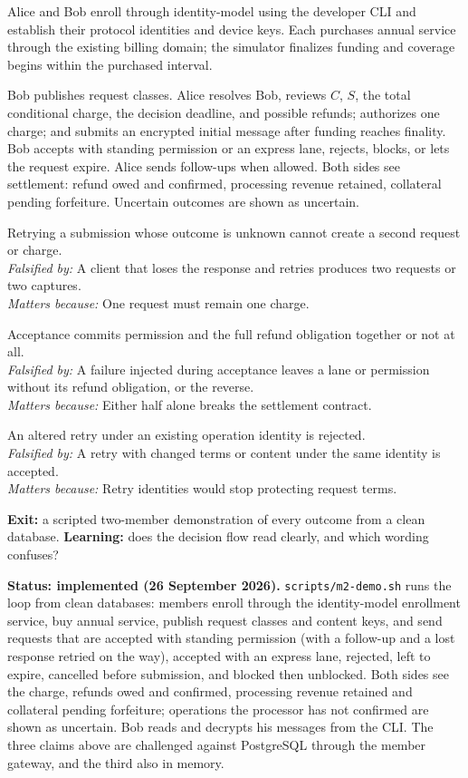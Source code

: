 \documentclass[11pt]{article}
\newenvironment{claims}{\begin{description}[leftmargin=1em,style=nextline,itemsep=0.4em]}{\end{description}}
\newcommand{\claim}[4]{\Needspace{6\baselineskip}\item[Claim (#1).] #2\\
    \textit{Falsified by:} #3\\
    \textit{Matters because:} #4}
\begin{document}
Alice and Bob enroll through identity-model using the developer CLI and establish
their protocol identities and device keys. Each purchases annual service through
the existing billing domain; the simulator finalizes funding and coverage begins
within the purchased interval.

Bob publishes request classes. Alice resolves Bob, reviews $C$, $S$, the total
conditional charge, the decision deadline, and possible refunds; authorizes one
charge; and submits an encrypted initial message after funding reaches finality.
Bob accepts with standing permission or an express lane, rejects, blocks, or lets
the request expire. Alice sends follow-ups when allowed. Both sides see settlement:
refund owed and confirmed, processing revenue retained, collateral pending
forfeiture. Uncertain outcomes are shown as uncertain.

\begin{claims}
\claim{PostgreSQL}{Retrying a submission whose outcome is unknown cannot create a second request or charge.}
    {A client that loses the response and retries produces two requests or two captures.}
    {One request must remain one charge.}
\claim{PostgreSQL}{Acceptance commits permission and the full refund obligation together or not at all.}
    {A failure injected during acceptance leaves a lane or permission without its refund obligation, or the reverse.}
    {Either half alone breaks the settlement contract.}
\claim{in-memory and PostgreSQL}{An altered retry under an existing operation identity is rejected.}
    {A retry with changed terms or content under the same identity is accepted.}
    {Retry identities would stop protecting request terms.}
\end{claims}

\textbf{Exit:} a scripted two-member demonstration of every outcome from a clean
database. \textbf{Learning:} does the decision flow read clearly, and which wording
confuses?

\textbf{Status: implemented (26 September 2026).} \texttt{scripts/m2-demo.sh} runs
the loop from clean databases: members enroll through the identity-model enrollment
service, buy annual service, publish request classes and content keys, and send
requests that are accepted with standing permission (with a follow-up and a lost
response retried on the way), accepted with an express lane, rejected, left to
expire, cancelled before submission, and blocked then unblocked. Both sides see the
charge, refunds owed and confirmed, processing revenue retained and collateral
pending forfeiture; operations the processor has not confirmed are shown as
uncertain. Bob reads and decrypts his messages from the CLI. The three claims above
are challenged against PostgreSQL through the member gateway, and the third also in
memory.
\end{document}
